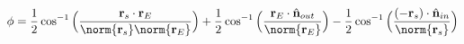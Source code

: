 \documentclass[crop=false,class=book,oneside]{standalone}
\begin{document}
        \begin{theorem}
            \begin{equation*}
                \phi=\frac{1}{2}\cos^{-1}
                    \Big(\frac{\mathbf{r}_{s}\cdot
                               \mathbf{r}_{E}}
                              {\norm{\mathbf{r}_{s}}
                               \norm{\mathbf{r}_{E}}}\Big)
                +\frac{1}{2}\cos^{-1}
                \Big(\frac{\mathbf{r}_{E}\cdot
                           \hat{\mathbf{n}}_{out}}
                          {\norm{\mathbf{r}_{E}}}\Big)
                -\frac{1}{2}\cos^{-1}
                \Big(\frac{(-\mathbf{r}_{s})\cdot
                           \hat{\mathbf{n}}_{in}}
                          {\norm{\mathbf{r}_{s}}}\Big)
            \end{equation*}
        \end{theorem}
\end{document}
